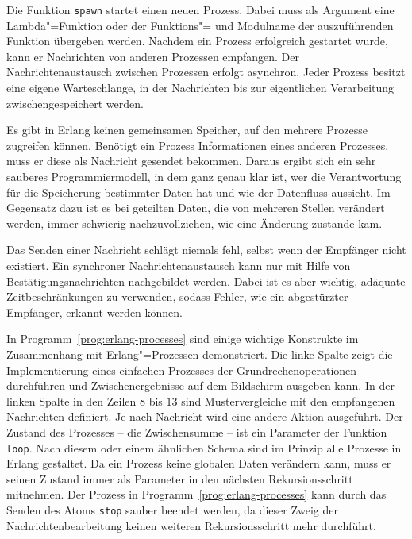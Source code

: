 Die Funktion \lstinline{spawn} startet einen neuen Prozess. Dabei muss als Argument eine Lambda"=Funktion oder der Funktions"= und Modulname der auszuführenden Funktion übergeben werden. Nachdem ein Prozess erfolgreich ge\-star\-tet wurde, kann er Nachrichten von anderen Prozessen empfangen. Der Nachrichtenaustausch zwischen Prozessen erfolgt asynchron. Jeder Prozess besitzt eine eigene Warteschlange, in der Nachrichten bis zur eigentlichen Verarbeitung zwischengespeichert werden.

Es gibt in Erlang keinen gemeinsamen Speicher, auf den mehrere Prozesse zugreifen können. Benötigt ein Prozess Informationen eines anderen Prozesses, muss er diese als Nachricht gesendet bekommen. Daraus ergibt sich ein sehr sauberes Programmiermodell, in dem ganz genau klar ist, wer die Verantwortung für die Speicherung bestimmter Daten hat und wie der Datenfluss aussieht. Im Gegensatz dazu ist es bei geteilten Daten, die von mehreren Stellen verändert werden, immer schwierig nachzuvollziehen, wie eine Änderung zustande kam.

Das Senden einer Nachricht schlägt niemals fehl, selbst wenn der Empfänger nicht existiert. Ein synchroner Nachrichtenaustausch kann nur mit Hilfe von Bestätigungsnachrichten nachgebildet werden. Dabei ist es aber wichtig, adäquate Zeitbeschränkungen zu verwenden, sodass Fehler, wie \zB ein abgestürzter Empfänger, erkannt werden können.

In Programm~\ref{prog:erlang-processes} sind einige wichtige Konstrukte im Zusammenhang mit Erlang"=Prozessen demonstriert. Die linke Spalte zeigt die Implementierung eines einfachen Prozesses der Grundrechenoperationen durchführen und Zwischenergebnisse auf dem Bildschirm ausgeben kann. In der linken Spalte in den Zeilen $8$ bis $13$ sind Mustervergleiche mit den empfangenen Nachrichten definiert. Je nach Nachricht wird eine andere Aktion ausgeführt. Der Zustand des Prozesses -- die Zwischensumme -- ist ein Parameter der Funktion \lstinline{loop}. Nach diesem oder einem ähnlichen Schema sind im Prinzip alle Prozesse in Erlang gestaltet. Da ein Prozess keine globalen Daten verändern kann, muss er seinen Zustand immer als Parameter in den nächsten Rekursionsschritt mitnehmen. Der Prozess in Programm~\ref{prog:erlang-processes} kann durch das Senden des Atoms \lstinline{stop} sauber beendet werden, da dieser Zweig der Nachrichtenbearbeitung keinen weiteren Rekursionsschritt mehr durchführt.

